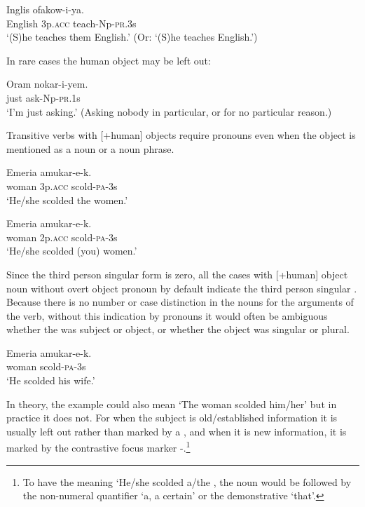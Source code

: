 \ea%
\label{ex:3:x551}
\gll Inglis  ofakow-i-ya. \\
English 3p.\textsc{acc} teach-Np-\textsc{pr}.3s\\
\glt`(S)he teaches them English.' (Or: `(S)he teaches English.')
\z

In rare cases the human object may be left out:

\ea%
\label{ex:3:x553}
\gll Oram nokar-i-yem. \\
just ask-Np-\textsc{pr}.1s\\
\glt`I'm just asking.' (Asking nobody in particular, or for no particular reason.)
\z

Transitive verbs with [+human] objects require pronouns even when the object is mentioned as a noun or a noun phrase.

\ea%
\label{ex:3:x554}
\gll Emeria  amukar-e-k. \\
woman 3p.\textsc{acc} scold-\textsc{pa}-3s\\
\glt`He/she scolded the women.'
\z

\ea%
\label{ex:3:x555}
\gll Emeria  amukar-e-k. \\
woman 2p.\textsc{acc} scold-\textsc{pa}-3s\\
\glt`He/she scolded (you) women.'
\z

Since the third person singular form is zero, all the cases with [+human] object noun without overt object pronoun by default indicate the third person singular . Because there is no number or case distinction in the nouns for the arguments of the verb, without this indication by pronouns it would often be ambiguous whether the  was subject or object, or whether the object was singular or plural. 

\ea%
\label{ex:3:x556}
\gll Emeria amukar-e-k. \\
woman scold-\textsc{pa}-3s\\
\glt`He scolded his wife.'
\z

In theory, the example  could also mean `The woman scolded him/her' but in practice it does not. For when the subject is old/established information it is usually left out rather than marked by a , and when it is new information, it is marked by the contrastive focus marker -.\footnote{To have the meaning `He/she scolded a/the , the noun would be followed by the non-numeral quantifier  `a, a certain' or the demonstrative  `that'.}

